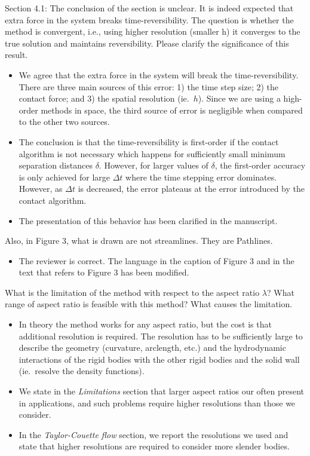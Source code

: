 \documentclass[11pt]{article}
\newcommand{\comment}[1]{{\color{blue} #1}}
\begin{document}
\noindent
\comment{Section 4.1: The conclusion of the section is unclear.  It is
  indeed expected that extra force in the system breaks
  time-reversibility.  The question is whether the method is convergent,
  i.e., using higher resolution (smaller h) it converges to the true
  solution and maintains reversibility.  Please clarify the significance
of this result.}
\begin{itemize}
  \item We agree that the extra force in the system will break the
    time-reversibility.  There are three main sources of this error: 1)
    the time step size; 2) the contact force; and 3) the spatial
    resolution (ie.~$h$).  Since we are using a high-order methods in
    space, the third source of error is negligible when compared to the
    other two sources.

  \item The conclusion is that the time-reversibility is first-order if
    the contact algorithm is not necessary which happens for
    sufficiently small minimum separation distances $\delta$.  However,
    for larger values of $\delta$, the first-order accuracy is only
    achieved for large $\Delta t$ where the time stepping error
    dominates.  However, as $\Delta t$ is decreased, the error plateaus
    at the error introduced by the contact algorithm.

  \item The presentation of this behavior has been clarified in the
    manuscript.
\end{itemize}

\noindent
\comment{Also, in Figure 3, what is drawn are not streamlines.  They are
Pathlines.}
\begin{itemize}
  \item The reviewer is correct.  The language in the caption of Figure
    3 and in the text that refers to Figure 3 has been modified.
\end{itemize}


\noindent
\comment{What is the limitation of the method with respect to the aspect
ratio $\lambda$?  What range of aspect ratio is feasible with this
method?  What causes the limitation.}
\begin{itemize}
  \item In theory the method works for any aspect ratio, but the cost is
    that additional resolution is required.  The resolution has to be
    sufficiently large to describe the geometry (curvature, arclength,
    etc.) and the hydrodynamic interactions of the rigid bodies with the
    other rigid bodies and the solid wall (ie.~resolve the density
    functions).
    
  \item We state in the {\em Limitations} section that larger aspect
    ratios our often present in applications, and such problems require
    higher resolutions than those we consider.

  \item In the {\em Taylor-Couette flow} section, we report the
    resolutions we used and state that higher resolutions are required
    to consider more slender bodies.

\end{itemize}
\end{document}
